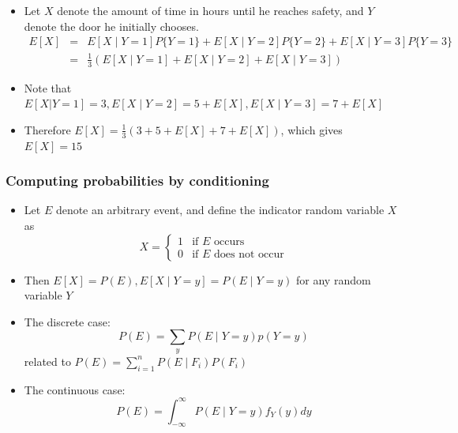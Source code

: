 \documentclass[slidestop,compress,mathserif]{beamer}
\begin{document}
\begin{frame}
\pause
{\small{
\begin{itemize}
\item Let $X$ denote the amount of time in hours until he reaches safety, and $Y$ denote the door he initially chooses.
{\scriptsize{
\begin{eqnarray*}
E[X] &=& E[X \mid Y = 1]P\{Y = 1\} + E[X \mid Y = 2]P\{Y = 2\} + E[X \mid Y = 3]P\{Y = 3\} \\
&=&
 \frac{1}{3}(E[X \mid Y = 1] + E[X \mid Y = 2] + E[X \mid Y = 3])
\end{eqnarray*}
}}
\pause
\item Note that $E[X|Y = 1] = 3, E[X \mid Y = 2] = 5 + E[X], E[X \mid Y = 3] = 7 + E[X]$
\item Therefore $E[X] = \frac{1}{3}(3 + 5 + E[X] + 7 + E[X])$, which gives $E[X] = 15$
\end{itemize}
}}
\end{frame}


\begin{frame}\frametitle{Computing probabilities by conditioning}
\begin{itemize}
\item Let $E$ denote an arbitrary event, and define the indicator random variable $X$ as
\[ X = \begin{cases}
    1& \text{if $E$ occurs } \\
    0         & \text{if $E$ does not occur}
\end{cases}
 \]
\item Then $E[X] = P(E), E[X \mid Y = y] = P(E \mid Y = y)$ for any random variable $Y$
\vspace{2mm}
\item The discrete case:
$$P(E) = \sum_yP(E \mid Y = y)p(Y = y)$$
related to $P(E) = \sum_{i=1}^nP(E \mid F_i)P(F_i)$
\vspace{2mm}
\pause
\item The continuous case:
$$P(E) = \int_{-\infty}^{\infty}P(E \mid Y = y)f_Y(y)dy$$
\end{itemize}
\end{frame}
\end{document}
